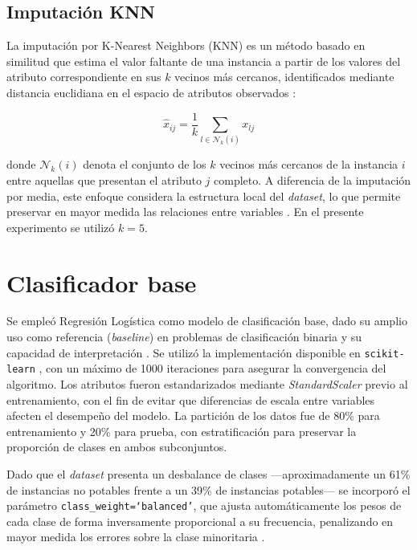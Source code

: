 \subsection{Imputación KNN}

La imputación por K-Nearest Neighbors (KNN) es un método basado en
similitud que estima el valor faltante de una instancia a partir de los
valores del atributo correspondiente en sus $k$ vecinos más cercanos,
identificados mediante distancia euclidiana en el espacio de atributos
observados \parencite{troyanskaya2001}:

\[
\hat{x}_{ij} = \frac{1}{k} \sum_{l \in \mathcal{N}_k(i)} x_{lj}
\]

donde $\mathcal{N}_k(i)$ denota el conjunto de los $k$ vecinos más
cercanos de la instancia $i$ entre aquellas que presentan el atributo
$j$ completo. A diferencia de la imputación por media, este enfoque
considera la estructura local del \textit{dataset}, lo que permite preservar en
mayor medida las relaciones entre variables \parencite{salgado2016}.
En el presente experimento se utilizó $k = 5$.

\section{Clasificador base}

Se empleó Regresión Logística como modelo de clasificación base, dado su
amplio uso como referencia (\textit{baseline}) en problemas de clasificación
binaria y su capacidad de interpretación \parencite{bishop2006}. Se utilizó
la implementación disponible en \texttt{scikit-learn}
\parencite{pedregosa2011}, con un máximo de 1000 iteraciones para asegurar
la convergencia del algoritmo. Los atributos fueron estandarizados mediante
\textit{StandardScaler} previo al entrenamiento, con el fin de evitar que
diferencias de escala entre variables afecten el desempeño del modelo. La
partición de los datos fue de 80\% para entrenamiento y 20\% para prueba,
con estratificación para preservar la proporción de clases en ambos
subconjuntos.

Dado que el \textit{dataset} presenta un desbalance de clases —aproximadamente
un 61\% de instancias no potables frente a un 39\% de instancias
potables— se incorporó el parámetro \texttt{class\_weight=‘balanced'},
que ajusta automáticamente los pesos de cada clase de forma inversamente
proporcional a su frecuencia, penalizando en mayor medida los errores
sobre la clase minoritaria \parencite{japkowicz2002}.


